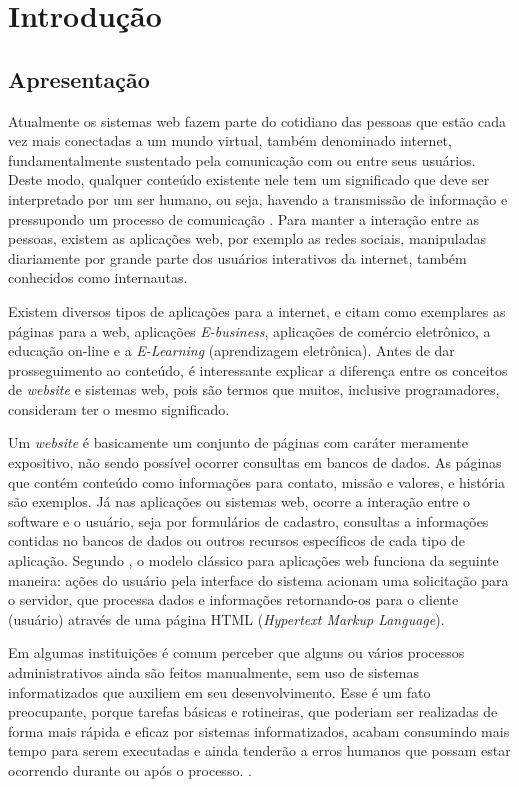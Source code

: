 \newpage
\chapter{Introdução}
\hspace{2.5cm}

\section{Apresentação}
Atualmente os sistemas web fazem parte do cotidiano das pessoas que estão cada vez mais conectadas a um mundo virtual, também denominado internet, fundamentalmente sustentado pela comunicação com ou entre seus usuários.
Deste modo, qualquer conteúdo existente nele tem um significado que deve ser interpretado por um ser humano, ou seja, havendo a transmissão de informação e pressupondo um processo de comunicação . Para manter a interação entre as pessoas, existem as aplicações web, por exemplo as redes sociais, manipuladas diariamente por grande parte dos usuários interativos da internet, também conhecidos como internautas. 

Existem diversos tipos de aplicações para a internet,  e  citam como exemplares as páginas para a web, aplicações \textit{E-business}, aplicações de comércio eletrônico, a educação on-line e a \textit{E-Learning} (aprendizagem eletrônica). Antes de dar prosseguimento ao conteúdo, é interessante explicar a diferença entre os conceitos de \textit{website} e sistemas web, pois são termos que muitos, inclusive programadores, consideram ter o mesmo significado. 

Um \textit{website} é basicamente um conjunto de páginas com caráter meramente expositivo, não sendo possível ocorrer consultas em bancos de dados. As páginas que contém conteúdo como informações para contato, missão e valores, e história são exemplos. Já nas aplicações ou sistemas web, ocorre a interação entre o software e o usuário, seja por formulários de cadastro, consultas a informações contidas no bancos de dados ou outros recursos específicos de cada tipo de aplicação. Segundo , o modelo clássico para aplicações web funciona da seguinte maneira: ações do usuário pela interface do sistema acionam uma solicitação para o servidor, que processa dados e informações retornando-os para o cliente (usuário) através de uma página HTML
(\textit{Hypertext Markup Language}).

Em algumas instituições é comum perceber que alguns ou vários processos administrativos ainda são feitos manualmente, sem uso de sistemas informatizados que auxiliem em seu desenvolvimento. Esse é um fato preocupante, porque tarefas básicas e rotineiras, que poderiam ser realizadas de forma mais rápida e eficaz por sistemas informatizados, acabam consumindo mais tempo para serem executadas e ainda tenderão a erros humanos que possam estar ocorrendo durante ou após o processo. \cite{othman2009development}. 

